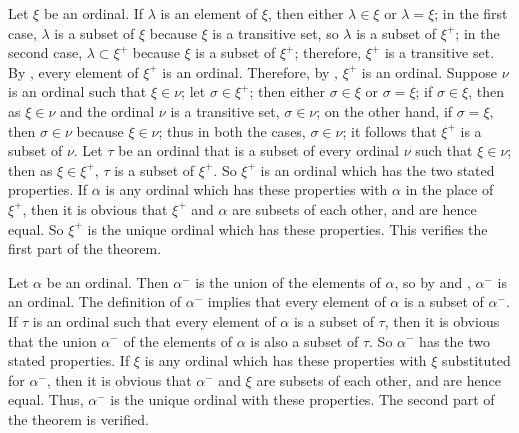 \documentclass{article}
\begin{document}
Let \(\xi\) be an ordinal.  If \(\lambda\) is an element of \(\xi\),
then either \(\lambda \in \xi\) or \(\lambda = \xi\); in the first
case, \(\lambda\) is a subset of \(\xi\) because \(\xi\) is a
transitive set, so \(\lambda\) is a subset of \(\xi^+\); in the second
case, \(\lambda \subset \xi^+\) because \(\xi\) is a subset of
\(\xi^+\); therefore, \(\xi^+\) is a transitive set.  By
, every element of \(\xi^+\) is an ordinal.
Therefore, by , \(\xi^+\) is an ordinal.  Suppose
\(\nu\) is an ordinal such that \(\xi \in \nu\); let
\(\sigma \in \xi^+\); then either \(\sigma \in \xi\) or
\(\sigma = \xi\); if \(\sigma \in \xi\), then as \(\xi \in \nu\) and
the ordinal \(\nu\) is a transitive set, \(\sigma \in \nu\); on the
other hand, if \(\sigma = \xi\), then \(\sigma \in \nu\) because
\(\xi \in \nu\); thus in both the cases, \(\sigma \in \nu\); it
follows that \(\xi^+\) is a subset of \(\nu\).  Let \(\tau\) be an
ordinal that is a subset of every ordinal \(\nu\) such that
\(\xi \in \nu\); then as \(\xi \in \xi^+\), \(\tau\) is a subset of
\(\xi^+\).  So \(\xi^+\) is an ordinal which has the two stated
properties.  If \(\alpha\) is any ordinal which has these properties
with \(\alpha\) in the place of \(\xi^+\), then it is obvious that
\(\xi^+\) and \(\alpha\) are subsets of each other, and are hence
equal.  So \(\xi^+\) is the unique ordinal which has these properties.
This verifies the first part of the theorem.

Let \(\alpha\) be an ordinal.  Then \(\alpha^-\) is the union of the
elements of \(\alpha\), so by  and
, \(\alpha^-\) is an ordinal.  The definition of
\(\alpha^-\) implies that every element of \(\alpha\) is a subset of
\(\alpha^-\).  If \(\tau\) is an ordinal such that every element of
\(\alpha\) is a subset of \(\tau\), then it is obvious that the union
\(\alpha^-\) of the elements of \(\alpha\) is also a subset of
\(\tau\).  So \(\alpha^-\) has the two stated properties.  If \(\xi\)
is any ordinal which has these properties with \(\xi\) substituted for
\(\alpha^-\), then it is obvious that \(\alpha^-\) and \(\xi\) are
subsets of each other, and are hence equal.  Thus, \(\alpha^-\) is the
unique ordinal with these properties.  The second part of the theorem
is verified.
\end{document}
